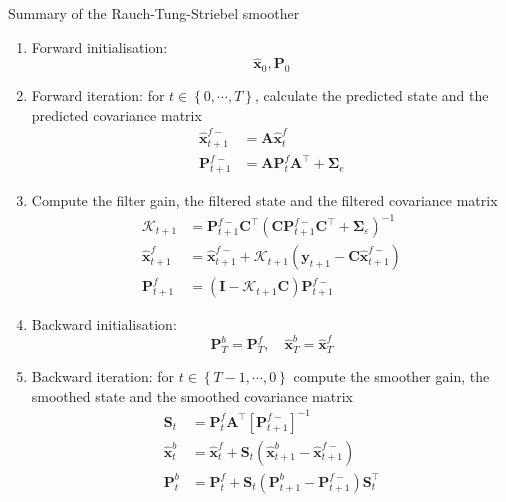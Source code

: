 \documentclass[11pt,draftcls,onecolumn,peerreview]{IEEEtran}
\begin{document}
\begin{algorithm}
\caption{Summary of the Rauch-Tung-Striebel smoother}
\label{alg:MRA-RTS}
 \begin{enumerate}
 \item Forward initialisation: 
 \begin{equation*}
 \hat{\mathbf x}_0, \mathbf P_0
 \end{equation*}
 \item Forward iteration: for $t\in\left\lbrace 0,\cdots,T\right\rbrace $, calculate the predicted state and the predicted covariance matrix
 \begin{align}
 \hat{\mathbf x}_{t+1}^{f-}&=\mathbf A \hat{\mathbf x}_{t}^{f} \nonumber \\
 \mathbf P_{t+1}^{f-}&=\mathbf A \mathbf P_{t}^{f}\mathbf A^{\top}+\boldsymbol\Sigma_e \nonumber 
 \end{align}
 \item Compute the filter gain, the filtered state and the filtered covariance matrix
 \begin{align}
 \mathcal K_{t+1}&=\mathbf P_{t +1}^{f-}\mathbf C ^\top(\mathbf C \mathbf P_{t +1}^{f-}\mathbf C ^\top+\boldsymbol \Sigma_{\varepsilon})^{-1} \nonumber\\
\hat{\mathbf x}_{t+1}^{f}&=\hat{\mathbf x}_{t+1}^{f-}+\mathcal K_{t+1}(\mathbf y_{t+1}-\mathbf C\hat{\mathbf x}_{t +1}^{f-})\nonumber \\
 \mathbf P_{t+1}^f&=(\mathbf I - \mathcal K_{t+1}\mathbf C)\mathbf P_{t +1}^{f-} \nonumber 
 \end{align}
 \item  Backward initialisation:
 \begin{equation*}
 \mathbf P_T^b= \mathbf P_T^f, \quad \hat{\mathbf x}^b_T= \hat{\mathbf x}^f_T
 \end{equation*}
 \item Backward iteration: for $t\in\left\lbrace T-1,\cdots,0\right\rbrace $ compute the smoother gain, the smoothed state and the smoothed covariance matrix
 \begin{align}
  \mathbf S_{t}&=\mathbf P_{t}^{f}\mathbf A^{\top}\left[ \mathbf P_{t +1}^{f-}\right]^{-1} \nonumber\\
 \hat{\mathbf x}_t^b&=\hat{\mathbf x}_t^f+\mathbf S_t(\hat{\mathbf x}_{t+1}^{b}-\hat{\mathbf x}_{t+1}^{f-})\nonumber \\
 \mathbf P_{t}^{b}&=\mathbf P_{t}^{f}+\mathbf S_t(\mathbf P_{t+1}^{b}-\mathbf P_{t+1}^{f-})\mathbf S_t^\top \nonumber

\end{align}
\end{enumerate}
\end{algorithm}
\end{document}

